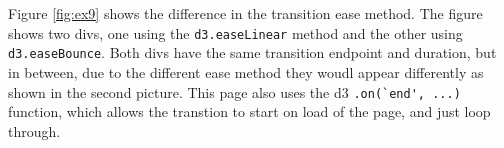 \documentclass{scrreprt}
\begin{document}
\FloatBarrier
% 
Figure \ref{fig:ex9} shows the difference in the transition ease method. The figure shows two divs, one using the \verb|d3.easeLinear| method and the other using \verb|d3.easeBounce|. Both divs have the same transition endpoint and duration, but in between, due to the different ease method they woudl appear differently as shown in the second picture. This page also uses the d3 \verb|.on(`end', ...)| function, which allows the transtion to start on load of the page, and just loop through.
\end{document}
